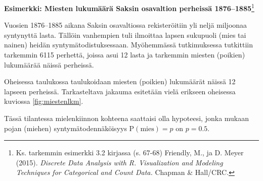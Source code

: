 \documentclass[
]{book}
\begin{document}
\begin{eblock}{}
\textbf{Esimerkki: Miesten lukumäärä Saksin osavaltion perheissä 1876--1885}\footnote{Ks. tarkemmin esimerkki 3.2 kirjassa (s. 67-68) Friendly, M., ja D. Meyer (2015). \emph{Discrete Data Analysis with R. Visualization and Modeling Techniques for Categorical and Count Data.} Chapman \& Hall/CRC.}

Vuosien 1876--1885 aikana Saksin osavaltiossa rekisteröitiin yli neljä miljoonaa syntynyttä lasta. Tällöin vanhempien tuli ilmoittaa lapsen sukupuoli (mies tai nainen) heidän syntymätodistuksessaan. Myöhemmässä tutkimuksessa tutkittiin tarkemmin 6115 perhettä, joissa asui 12 lasta ja tarkemmin miesten (poikien) lukumäärää näissä perheissä.

Oheisessa taulukossa taulukoidaan miesten (poikien) lukumäärät näissä 12 lapseen perheissä. Tarkasteltava jakauma esitetään vielä erikseen oheisessa kuviossa \ref{fig:miestenlkm}.

Tässä tilantessa mielenkiinnon kohteena saattaisi olla hypoteesi, jonka mukaan pojan (miehen) syntymätodennäköisyys \(\text{P}(\mathrm{mies}) = p\) on \(p=0.5\).

\end{eblock}

\FloatBarrier

\begin{table}
\centering\begingroup\fontsize{12}{14}\selectfont

\endgroup{}
\end{table}

\FloatBarrier
\end{document}
